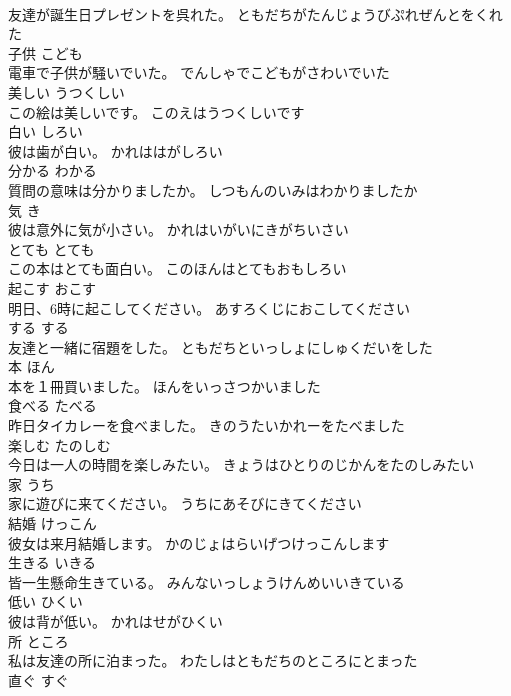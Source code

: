 \documentclass[8pt]{extreport}
\begin{document}
\begin{CJK}{UTF8}{min}
\\	友達が誕生日プレゼントを呉れた。	ともだちがたんじょうびぷれぜんとをくれた	
\\	子供	こども	
\\	電車で子供が騒いでいた。	でんしゃでこどもがさわいでいた	
\\	美しい	うつくしい	
\\	この絵は美しいです。	このえはうつくしいです	
\\	白い	しろい	
\\	彼は歯が白い。	かれははがしろい	
\\	分かる	わかる	
\\	質問の意味は分かりましたか。	しつもんのいみはわかりましたか	
\\	気	き	
\\	彼は意外に気が小さい。	かれはいがいにきがちいさい	
\\	とても	とても	
\\	この本はとても面白い。	このほんはとてもおもしろい	
\\	起こす	おこす	
\\	明日、6時に起こしてください。	あすろくじにおこしてください	
\\	する	する	
\\	友達と一緒に宿題をした。	ともだちといっしょにしゅくだいをした	
\\	本	ほん	
\\	本を１冊買いました。	ほんをいっさつかいました	
\\	食べる	たべる	
\\	昨日タイカレーを食べました。	きのうたいかれーをたべました	
\\	楽しむ	たのしむ	
\\	今日は一人の時間を楽しみたい。	きょうはひとりのじかんをたのしみたい	
\\	家	うち	
\\	家に遊びに来てください。	うちにあそびにきてください	
\\	結婚	けっこん	
\\	彼女は来月結婚します。	かのじょはらいげつけっこんします	
\\	生きる	いきる	
\\	皆一生懸命生きている。	みんないっしょうけんめいいきている	
\\	低い	ひくい	
\\	彼は背が低い。	かれはせがひくい	
\\	所	ところ	
\\	私は友達の所に泊まった。	わたしはともだちのところにとまった	
\\	直ぐ	すぐ	

\end{CJK}
\end{document}
